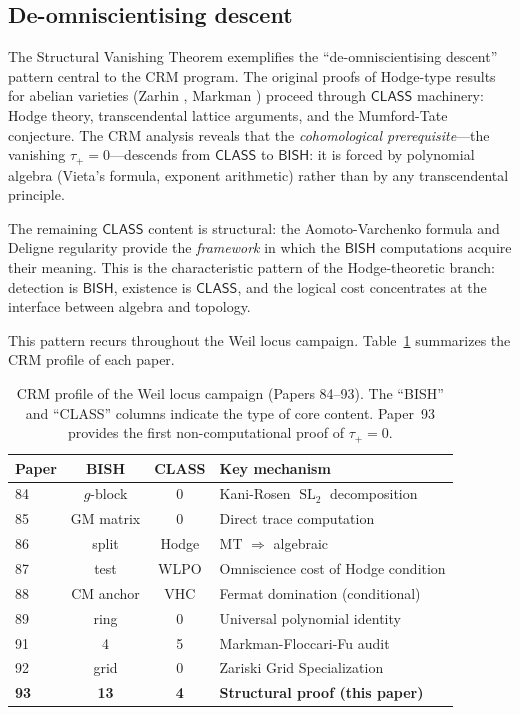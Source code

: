 \documentclass[11pt]{article}
\theoremstyle{plain}
\theoremstyle{definition}
\theoremstyle{remark}
\newcommand{\SL}{\operatorname{SL}}
\newcommand{\BISH}{\mathsf{BISH}}
\newcommand{\CLASS}{\mathsf{CLASS}}
\begin{document}
\subsection{De-omniscientising descent}

The Structural Vanishing Theorem exemplifies the ``de-omniscientising descent''
pattern central to the CRM program.  The original proofs of Hodge-type
results for abelian varieties (Zarhin \cite{zarhin}, Markman \cite{markman})
proceed through $\CLASS$ machinery: Hodge theory, transcendental lattice
arguments, and the Mumford-Tate conjecture.  The CRM analysis reveals that
the \emph{cohomological prerequisite}---the vanishing $\tau_+ = 0$---descends
from $\CLASS$ to $\BISH$: it is forced by polynomial algebra (Vieta's formula,
exponent arithmetic) rather than by any transcendental principle.

The remaining $\CLASS$ content is structural: the Aomoto-Varchenko formula
and Deligne regularity provide the \emph{framework} in which the $\BISH$
computations acquire their meaning.  This is the characteristic pattern
of the Hodge-theoretic branch: detection is $\BISH$, existence is $\CLASS$,
and the logical cost concentrates at the interface between algebra and topology.

This pattern recurs throughout the Weil locus campaign.  Table~\ref{tab:campaign-audit}
summarizes the CRM profile of each paper.

\begin{table}[ht]
\centering
\begin{tabular}{lccl}
\toprule
\textbf{Paper} & \textbf{BISH} & \textbf{CLASS} & \textbf{Key mechanism} \\
\midrule
84 \cite{p84} & $g$-block & 0 & Kani-Rosen $\SL_2$ decomposition \\
85 \cite{p85} & GM matrix & 0 & Direct trace computation \\
86 \cite{p86} & split & Hodge & MT $\Rightarrow$ algebraic \\
87 \cite{p87} & test & WLPO & Omniscience cost of Hodge condition \\
88 \cite{p88} & CM anchor & VHC & Fermat domination (conditional) \\
89 \cite{p89} & ring & 0 & Universal polynomial identity \\
91 \cite{p91} & 4 & 5 & Markman-Floccari-Fu audit \\
92 \cite{p92} & grid & 0 & Zariski Grid Specialization \\
\textbf{93} & \textbf{13} & \textbf{4} & \textbf{Structural proof (this paper)} \\
\bottomrule
\end{tabular}
\caption{CRM profile of the Weil locus campaign (Papers 84--93).
  The ``BISH'' and ``CLASS'' columns indicate the type of core content.
  Paper~93 provides the first non-computational proof of $\tau_+ = 0$.}
\label{tab:campaign-audit}
\end{table}
\end{document}

